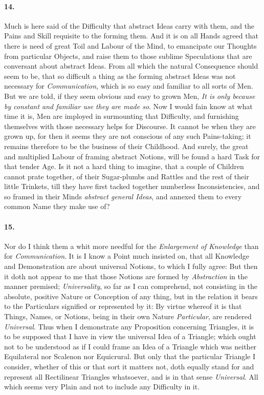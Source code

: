 \documentclass[]{article}
\newenvironment{sectionbody}{\begin{multicols}{2}}{\end{multicols}}
\begin{document}
\begin{sectionbody}
\paragraph{14.} Much is here said of the Difficulty that abstract Ideas carry
with them, and the Pains and Skill requisite to the forming them.
And it is on all Hands agreed that there is need of great Toil
and Labour of the Mind, to emancipate our Thoughts from
particular Objects, and raise them to those sublime Speculations
that are conversant about abstract Ideas.  From all which the
natural Consequence should seem to be, that so difficult a thing
as the forming abstract Ideas was not necessary for
\emph{Communication}, which is so easy and familiar to all
sorts of Men.  But we are told, if they seem obvious and easy to
grown Men, \emph{It is only because by constant and familiar use
they are made so}.  Now I would fain know at what time it is,
Men are imployed in surmounting that Difficulty, and furnishing
themselves with those necessary helps for Discourse.  It cannot
be when they are grown up, for then it seems they are not
conscious of any such Pains-taking; it remains therefore to be
the business of their Childhood.  And surely, the great and
multiplied Labour of framing abstract Notions, will be found a
hard Task for that tender Age.  Is it not a hard thing to
imagine, that a couple of Children cannot prate together, of
their Sugar-plumbs and Rattles and the rest of their little
Trinkets, till they have first tacked together numberless
Inconsistencies, and so framed in their Minds \emph{abstract
general Ideas}, and annexed them to every common Name they
make use of?



\paragraph{15.} Nor do I think them a whit more needful for the \emph{Enlargement
of Knowledge} than for \emph{Communication}.  It is I know
a Point much insisted on, that all Knowledge and Demonstration
are about universal Notions, to which I fully agree: But then it
doth not appear to me that those Notions are formed by
\emph{Abstraction} in the manner premised;
\emph{Universality}, so far as I can comprehend, not consisting
in the absolute, positive Nature or Conception of any thing, but
in the relation it bears to the Particulars signified or
represented by it: By virtue whereof it is that Things, Names, or
Notions, being in their own Nature \emph{Particular}, are
rendered \emph{Universal}.  Thus when I demonstrate any
Proposition concerning Triangles, it is to be supposed that I
have in view the universal Idea of a Triangle; which ought not to
be understood as if I could frame an Idea of a Triangle which was
neither Equilateral nor Scalenon nor Equicrural.  But only that
the particular Triangle I consider, whether of this or that sort
it matters not, doth equally stand for and represent all
Rectilinear Triangles whatsoever, and is in that sense
\emph{Universal}.  All which seems very Plain and not to
include any Difficulty in it.




\end{sectionbody}
\end{document}
